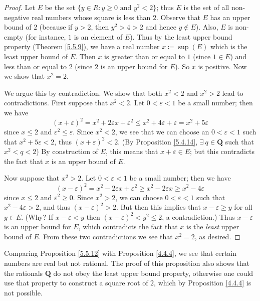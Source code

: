 \begin{proof}
    Let \(E\) be the set \(\{y \in R : y \geq 0 \text{ and } y^2 < 2\}\);
    thus \(E\) is the set of all non-negative real numbers whose square is less than \(2\).
    Observe that \(E\) has an upper bound of \(2\) (because if \(y > 2\), then \(y^2 > 4 > 2\) and hence \(y \notin E\)).
    Also, \(E\) is non-empty (for instance, \(1\) is an element of \(E\)).
    Thus by the least upper bound property (Theorem \ref{5.5.9}), we have a real number \(x \coloneqq \sup(E)\) which is the least upper bound of \(E\).
    Then \(x\) is greater than or equal to \(1\) (since \(1 \in E\)) and less than or equal to \(2\)
    (since \(2\) is an upper bound for \(E\)).
    So \(x\) is positive.
    Now we show that \(x^2 = 2\).

    We argue this by contradiction.
    We show that both \(x^2 < 2\) and \(x^2 > 2\) lead to contradictions.
    First suppose that \(x^2 < 2\).
    Let \(0 < \varepsilon < 1\) be a small number;
    then we have
    \[
        (x + \varepsilon)^2 = x^2 + 2\varepsilon x + \varepsilon^2 \leq x^2 + 4\varepsilon + \varepsilon = x^2 + 5\varepsilon
    \]
    since \(x \leq 2\) and \(\varepsilon^2 \leq \varepsilon\).
    Since \(x^2 < 2\), we see that we can choose an \(0 < \varepsilon < 1\) such that \(x^2 + 5\varepsilon < 2\), thus \((x + \varepsilon)^2 < 2\).
    (By Proposition \ref{5.4.14}, \(\exists\ q \in \mathbf{Q}\) such that \(x^2 < q < 2\))
    By construction of \(E\), this means that \(x + \varepsilon \in E\);
    but this contradicts the fact that \(x\) is an upper bound of \(E\).

    Now suppose that \(x^2 > 2\).
    Let \(0 < \varepsilon < 1\) be a small number;
    then we have
    \[
        (x - \varepsilon)^2 = x^2 - 2\varepsilon x + \varepsilon^2 \geq x^2 - 2\varepsilon x \geq x^2 - 4\varepsilon
    \]
    since \(x \leq 2\) and \(\varepsilon^2 \geq 0\).
    Since \(x^2 > 2\), we can choose \(0 < \varepsilon < 1\) such that \(x^2 - 4\varepsilon > 2\), and thus \((x - \varepsilon)^2 > 2\).
    But then this implies that \(x - \varepsilon \geq y\) for all \(y \in E\).
    (Why? If \(x - \varepsilon < y\) then \((x - \varepsilon)^2 < y^2 \leq 2\), a contradiction.)
    Thus \(x - \varepsilon\) is an upper bound for \(E\), which contradicts the fact that \(x\) is the \emph{least} upper bound of \(E\).
    From these two contradictions we see that \(x^2 = 2\), as desired.
\end{proof}

\begin{remark}\label{5.5.13}
    Comparing Proposition \ref{5.5.12} with Proposition \ref{4.4.4}, we see that certain numbers are real but not rational.
    The proof of this proposition also shows that the rationals \(\mathbf{Q}\) do not obey the least upper bound property, otherwise one could use that property to construct a square root of \(2\), which by Proposition \ref{4.4.4} is not possible.
\end{remark}

